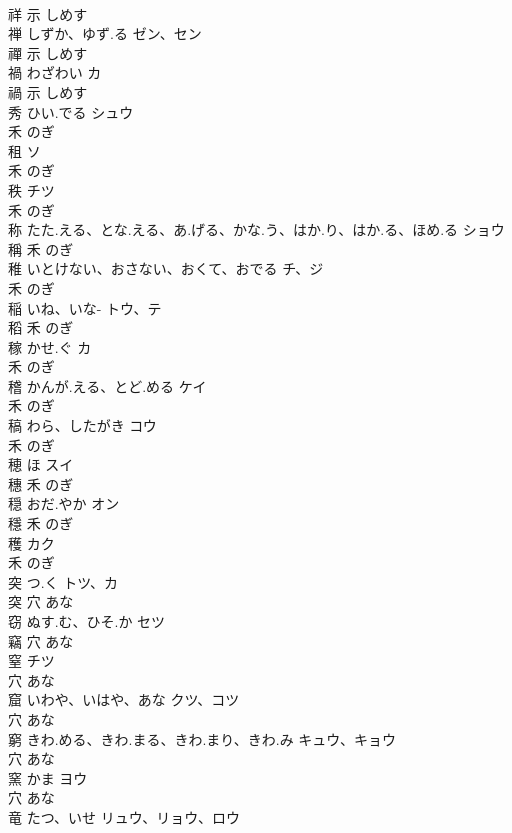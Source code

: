 \documentclass[8pt]{extreport}
\begin{document}
\begin{CJK}{UTF8}{min}
\\	祥	示		しめす		
\\	禅	しずか、ゆず.る	ゼン、セン	
\\	禪	示		しめす		
\\	禍	わざわい	カ	
\\	禍	示		しめす		
\\	秀	ひい.でる	シュウ	
\\	禾		のぎ		
\\	租		ソ	
\\	禾		のぎ		
\\	秩		チツ	
\\	禾		のぎ		
\\	称	たた.える、とな.える、あ.げる、かな.う、はか.り、はか.る、ほめ.る	ショウ	
\\	稱	禾		のぎ		
\\	稚	いとけない、おさない、おくて、おでる	チ、ジ	
\\	禾		のぎ		
\\	稲	いね、いな-	トウ、テ	
\\	稻	禾		のぎ		
\\	稼	かせ.ぐ	カ	
\\	禾		のぎ		
\\	稽	かんが.える、とど.める	ケイ	
\\	禾		のぎ		
\\	稿	わら、したがき	コウ	
\\	禾		のぎ		
\\	穂	ほ	スイ	
\\	穗	禾		のぎ		
\\	穏	おだ.やか	オン	
\\	穩	禾		のぎ		
\\	穫		カク	
\\	禾		のぎ		
\\	突	つ.く	トツ、カ	
\\	突	穴		あな		
\\	窃	ぬす.む、ひそ.か	セツ	
\\	竊	穴		あな		
\\	窒		チツ	
\\	穴		あな		
\\	窟	いわや、いはや、あな	クツ、コツ	
\\	穴		あな		
\\	窮	きわ.める、きわ.まる、きわ.まり、きわ.み	キュウ、キョウ	
\\	穴		あな		
\\	窯	かま	ヨウ	
\\	穴		あな		
\\	竜	たつ、いせ	リュウ、リョウ、ロウ	

\end{CJK}
\end{document}
